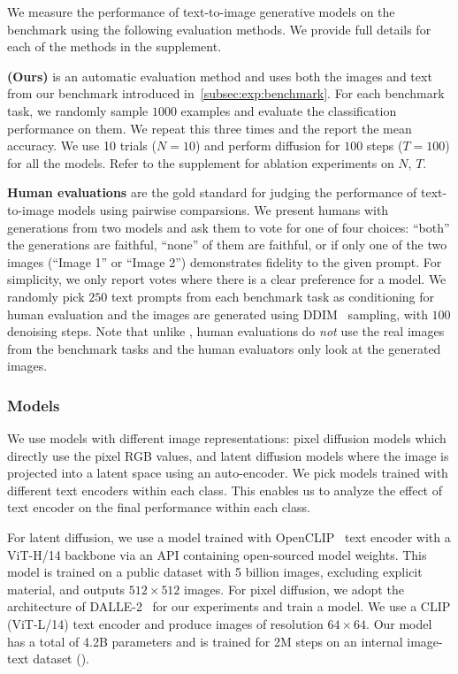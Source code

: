 We measure the performance of text-to-image generative models on the benchmark using the following evaluation methods.
We provide full details for each of the methods in the supplement.

\par \noindent \textbf{\OURS (Ours)} is an automatic evaluation method and uses both the images and text from our benchmark introduced in~\cref{subsec:exp:benchmark}.
For each benchmark task, we randomly sample $1000$ examples and evaluate the classification performance on them. We repeat this three times and the report the mean accuracy.
We use 10 trials (\ie$N=10$) and perform diffusion for $100$ steps (\ie$T=100$) for all the models. Refer to the supplement for ablation experiments on $N$, $T$.

\par \noindent \textbf{Human evaluations} are the gold standard for judging the performance of text-to-image models using pairwise comparsions.
We present humans with generations from two models and ask them to vote for one of four choices: ``both'' the generations are faithful, ``none'' of them are faithful, or if only one of the two images (``Image 1'' or ``Image 2'') demonstrates fidelity to the given prompt.
For simplicity, we only report votes where there is a clear preference for a model.
We randomly pick $250$ text prompts from each benchmark task as conditioning for human evaluation and the images are generated using DDIM~\cite{song2021denoising} sampling, with $100$ denoising steps.
Note that unlike \OURS, human evaluations do \emph{not} use the real images from the benchmark tasks and the human evaluators only look at the generated images.

\subsubsection{Models}\label{subsubsec:exp:benchmark:models}
We use models with different image representations: pixel diffusion models which directly use the pixel RGB values, and latent diffusion models where the image is projected into a latent space using an auto-encoder.
We pick models trained with different text encoders within each class.
This enables us to analyze the effect of text encoder on the final performance within each class.

\par {} For latent diffusion, we use a model trained with OpenCLIP~\cite{ilharco_gabriel_2021_5143773} text encoder with a ViT-H/14 backbone via an API containing open-sourced model weights. 
This model is trained on a public dataset with 5 billion images, excluding explicit material, and outputs $512\times512$ images.
For pixel diffusion, we adopt the architecture of DALLE-2~\cite{ramesh2022hierarchical} for our experiments and train a model.
We use a CLIP (ViT-L/14) text encoder and produce images of resolution $64\times 64$.
Our model has a total of 4.2B parameters and is trained for 2M steps on an internal image-text dataset (\DATASET).

